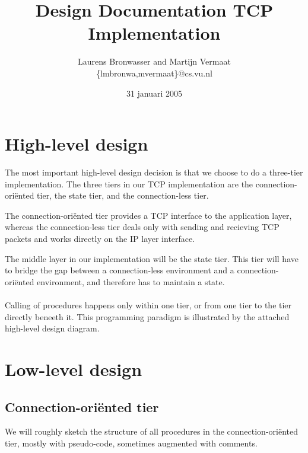 \documentclass[11pt]{article}
\title{Design Documentation TCP Implementation}
\author{
    Laurens Bronwasser and Martijn Vermaat\\
    \{lmbronwa,mvermaat\}@cs.vu.nl
}
\date{31 januari 2005}
\begin{document}
\maketitle


\lstset{
  numbers=none,
  basicstyle=\small,
  frame=tb,
  language=C,
  captionpos=b
}


\section{High-level design}


The most important high-level design decision is that we choose to do a
three-tier implementation. The three tiers in our TCP implementation are
the connection-ori\"ented tier, the state tier, and the connection-less
tier.

The connection-ori\"ented tier provides a TCP interface to the application
layer, whereas the connection-less tier deals only with sending and
recieving TCP packets and works directly on the IP layer interface.

The middle layer in our implementation will be the state tier. This tier
will have to bridge the gap between a connection-less environment and a
connection-ori\"ented environment, and therefore has to maintain a state.

\paragraph{}

Calling of procedures happens only within one tier, or from one tier to
the tier directly beneeth it. This programming paradigm is illustrated by the 
attached high-level design diagram.


\section{Low-level design}


\subsection{Connection-ori\"ented tier}


We will roughly sketch the structure of all procedures in the
connection-ori\"ented tier, mostly with pseudo-code, sometimes
augmented with comments.


\paragraph{}
\end{document}
